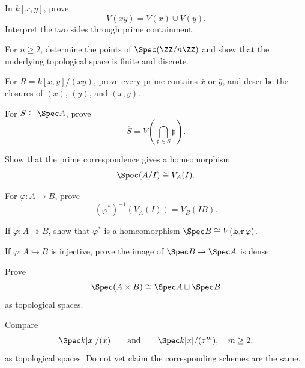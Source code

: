 \begin{exercise}[VI.07.E11 - CA13: $V(xy)$]
In $k[x,y]$, prove
\[
V(xy)=V(x)\cup V(y).
\]
Interpret the two sides through prime containment.
\end{exercise}

\begin{exercise}
For $n\ge2$, determine the points of $\Spec(\ZZ/n\ZZ)$ and show that the underlying
topological space is finite and discrete.
\end{exercise}

\begin{exercise}
For $R=k[x,y]/(xy)$, prove every prime contains $\bar x$ or $\bar y$, and describe the
closures of $(\bar x)$, $(\bar y)$, and $(\bar x,\bar y)$.
\end{exercise}

\begin{exercise}
For $S\subseteq\Spec A$, prove
\[
\overline S
=
V\!\left(\bigcap_{\mathfrak p\in S}\mathfrak p\right).
\]
\end{exercise}

\begin{exercise}
Show that the prime correspondence gives a homeomorphism
\[
\Spec(A/I)\cong V_A(I).
\]
\end{exercise}

\begin{exercise}
For $\varphi:A\to B$, prove
\[
(\varphi^\ast)^{-1}(V_A(I))=V_B(IB).
\]
\end{exercise}

\begin{exercise}[VI.07.E17 - Surjections]
If $\varphi:A\twoheadrightarrow B$, show that $\varphi^\ast$ is a homeomorphism
$\Spec B\cong V(\ker\varphi)$.
\end{exercise}

\begin{exercise}
If $\varphi:A\hookrightarrow B$ is injective, prove the image of
$\Spec B\to\Spec A$ is dense.
\end{exercise}

\begin{exercise}
Prove
\[
\Spec(A\times B)\cong\Spec A\sqcup\Spec B
\]
as topological spaces.
\end{exercise}

\begin{exercise}
Compare
\[
\Spec k[x]/(x)
\qquad\text{and}\qquad
\Spec k[x]/(x^m),\quad m\ge2,
\]
as topological spaces.  Do not yet claim the corresponding schemes are the same.
\end{exercise}
